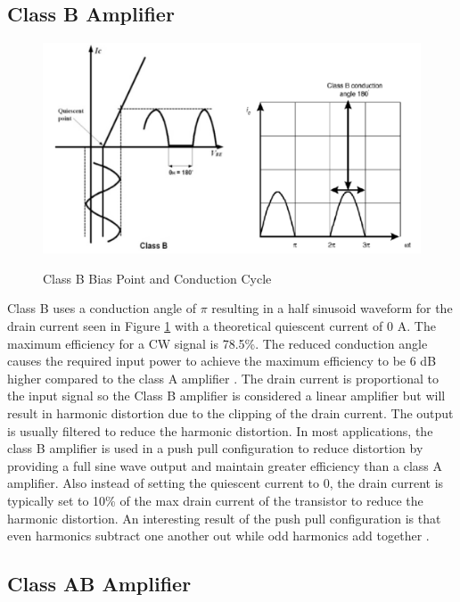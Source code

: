 \subsection{Class B Amplifier}

\begin{figure}
  \centering
  \includegraphics[width=6in]{figures/classes/classb_bias}\\
  \caption{Class B Bias Point and Conduction Cycle \cite{Rosu2001}}\label{classb_bias}
\end{figure}

Class B uses a conduction angle of $\pi$ resulting in a half sinusoid waveform for the drain current seen in Figure \ref{classb_bias} with a theoretical quiescent current of 0 A. The maximum efficiency for a CW signal is 78.5\%. The reduced conduction angle causes the required input power to achieve the maximum efficiency to be 6 dB higher compared to the class A amplifier \cite{C.Cripps2006}.
The drain current is proportional to the input signal so the Class B amplifier is considered a linear amplifier but will result in harmonic distortion due to the clipping of the drain current. The output is usually filtered to reduce the harmonic distortion\cite{Raab2003}.
In most applications, the class B amplifier is used in a push pull configuration to reduce distortion by providing a full sine wave output and maintain greater efficiency than a class A amplifier. Also instead of setting the quiescent current to 0, the drain current is typically set to 10\% of the max drain current of the transistor to reduce the harmonic distortion. An interesting result of the push pull configuration is that even harmonics subtract one another out while odd harmonics add together \cite{Rosu2001}.


\subsection{Class AB Amplifier}

